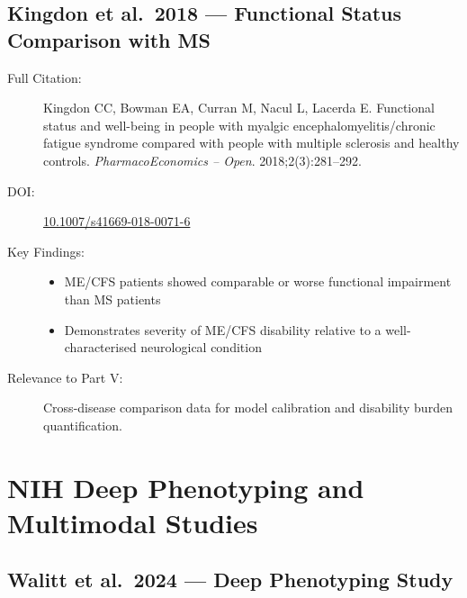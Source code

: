 \subsection{Kingdon et al.\ 2018 --- Functional Status Comparison with MS}

\begin{description}
    \item[Full Citation:] Kingdon CC, Bowman EA, Curran M, Nacul L, Lacerda E. Functional status and well-being in people with myalgic encephalomyelitis/chronic fatigue syndrome compared with people with multiple sclerosis and healthy controls. \textit{PharmacoEconomics -- Open}. 2018;2(3):281--292. \cite{kingdon2018functional}
    \item[DOI:] \href{https://doi.org/10.1007/s41669-018-0071-6}{10.1007/s41669-018-0071-6}
    \item[Key Findings:]
    \begin{itemize}
        \item ME/CFS patients showed comparable or worse functional impairment than MS patients
        \item Demonstrates severity of ME/CFS disability relative to a well-characterised neurological condition
    \end{itemize}
    \item[Relevance to Part V:] Cross-disease comparison data for model calibration and disability burden quantification.
\end{description}

\section{NIH Deep Phenotyping and Multimodal Studies}
\label{sec:bib-deep-phenotyping-additions}

\subsection{Walitt et al.\ 2024 --- Deep Phenotyping Study}


